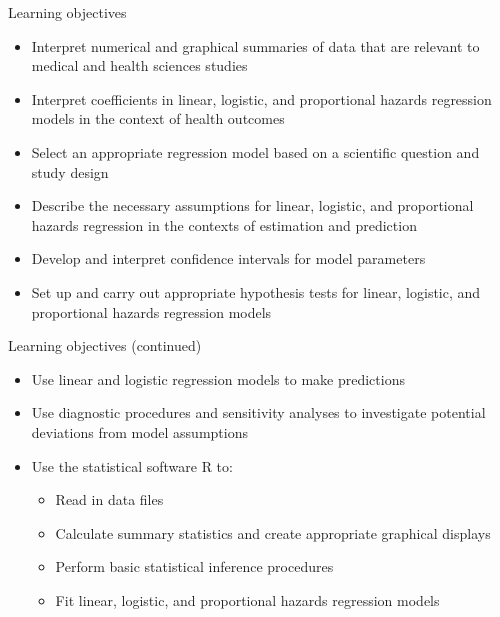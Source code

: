 \documentclass[10pt,t]{beamer}
\begin{document}
\begin{frame}{Learning objectives}
\begin{itemize}
	\item Interpret numerical and graphical summaries of data that are relevant to medical and health sciences studies
	\item Interpret coefficients in linear, logistic, and proportional hazards regression models in the context of health outcomes
	\item 
Select an appropriate regression model based on a scientific question and study design
	\item Describe the necessary assumptions for linear, logistic, and proportional hazards regression in the contexts of estimation and prediction
	\item Develop and interpret confidence intervals for model parameters
	\item Set up and carry out appropriate hypothesis tests for linear, logistic, and proportional hazards regression models
	
\end{itemize}
\end{frame}

\begin{frame}{Learning objectives (continued)}
\begin{itemize}
	\item Use linear and logistic regression models to make predictions
	\item Use diagnostic procedures and sensitivity analyses to investigate potential deviations from model assumptions
	\item Use the statistical software R to:
	\begin{itemize}
		\item Read in data files
		\item Calculate summary statistics and create appropriate graphical displays
		\item Perform basic statistical inference procedures
		\item Fit linear, logistic, and proportional hazards regression models
	\end{itemize}
\end{itemize}
\end{frame}
\end{document}
